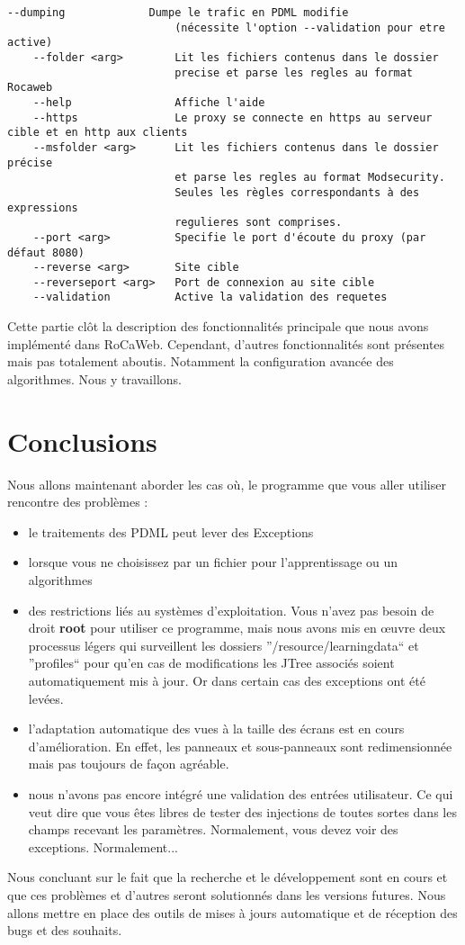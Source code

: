 \documentclass[a4paper,10pt,justified]{book}
\begin{document}
\begin{lstlisting}[basicstyle=\footnotesize]
    --dumping             Dumpe le trafic en PDML modifie 
                          (nécessite l'option --validation pour etre active)
    --folder <arg>        Lit les fichiers contenus dans le dossier 
                          precise et parse les regles au format Rocaweb
    --help                Affiche l'aide
    --https               Le proxy se connecte en https au serveur cible et en http aux clients
    --msfolder <arg>      Lit les fichiers contenus dans le dossier précise 
                          et parse les regles au format Modsecurity. 
                          Seules les règles correspondants à des expressions 
                          regulieres sont comprises.
    --port <arg>          Specifie le port d'écoute du proxy (par défaut 8080)
    --reverse <arg>       Site cible
    --reverseport <arg>   Port de connexion au site cible
    --validation          Active la validation des requetes
\end{lstlisting}




Cette partie clôt la description des fonctionnalités principale que nous avons implémenté dans RoCaWeb. 
Cependant, d'autres fonctionnalités sont présentes mais pas totalement aboutis. Notamment la configuration avancée des 
algorithmes. Nous y travaillons. 


\chapter{Conclusions}
Nous allons maintenant aborder les cas où, le programme que vous aller utiliser rencontre des problèmes :  
\begin{itemize}
 \item le traitements des PDML peut lever des Exceptions 
 \item lorsque vous ne choisissez par un fichier pour l'apprentissage ou un algorithmes
 \item des restrictions liés au systèmes d'exploitation. Vous n'avez pas besoin de droit \textbf{root} pour utiliser ce programme, mais nous avons mis en œuvre deux processus légers qui surveillent
 les dossiers ''/resource/learningdata`` et ''profiles`` pour qu'en cas de modifications les JTree associés soient automatiquement mis à jour. Or dans certain cas des exceptions ont été levées. 
 
 
 \item l'adaptation automatique des vues à la taille des écrans est en cours d'amélioration. En effet, les panneaux et sous-panneaux sont redimensionnée mais pas toujours
 de façon agréable. 
 \item nous n'avons pas encore intégré une validation des entrées utilisateur. Ce qui veut dire que vous êtes libres de tester des injections de toutes sortes dans les 
 champs recevant les paramètres. Normalement, vous devez voir des exceptions. Normalement...
 
\end{itemize}

Nous concluant sur le fait que la recherche et le développement sont en cours et que ces problèmes et d'autres seront solutionnés dans les versions futures. 
Nous allons mettre en place des outils de mises à jours automatique et de réception des bugs et des souhaits. 
\end{document}
